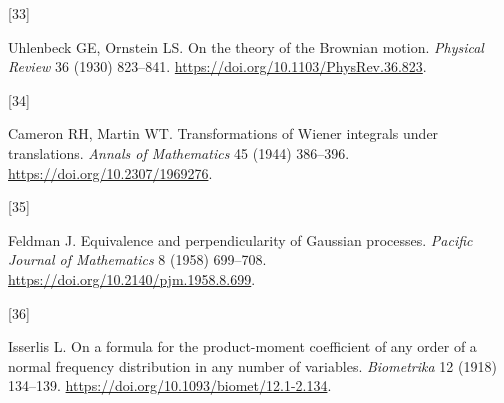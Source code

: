\documentclass[ejs]{imsart}
\newlength{\cslhangindent}\setlength{\cslhangindent}{1.5em}
\newlength{\csllabelwidth}\setlength{\csllabelwidth}{3em}
\newenvironment{CSLReferences}[2]
 {\begin{list}{}{\setlength{\itemindent}{0pt}\setlength{\leftmargin}{0pt}\setlength{\parsep}{0pt}
 \ifodd #1\setlength{\leftmargin}{\cslhangindent}\setlength{\itemindent}{-1\cslhangindent}\fi
 \setlength{\itemsep}{#2\baselineskip}}}{\end{list}}
\newcommand{\CSLLeftMargin}[1]{\parbox[t]{\csllabelwidth}{\strut#1\strut}}
\newcommand{\CSLRightInline}[1]{\parbox[t]{\linewidth-\csllabelwidth}{\strut#1\strut}}
\begin{document}
\begin{CSLReferences}{0}{0}
\CSLLeftMargin{{[}33{]} }%
\CSLRightInline{Uhlenbeck GE, Ornstein LS. On the theory of the
{B}rownian motion. \emph{Physical Review} 36 (1930) 823--841.
\url{https://doi.org/10.1103/PhysRev.36.823}.}

\CSLLeftMargin{{[}34{]} }%
\CSLRightInline{Cameron RH, Martin WT. Transformations of {W}iener
integrals under translations. \emph{Annals of Mathematics} 45 (1944)
386--396. \url{https://doi.org/10.2307/1969276}.}

\CSLLeftMargin{{[}35{]} }%
\CSLRightInline{Feldman J. Equivalence and perpendicularity of
{G}aussian processes. \emph{Pacific Journal of Mathematics} 8 (1958)
699--708. \url{https://doi.org/10.2140/pjm.1958.8.699}.}

\CSLLeftMargin{{[}36{]} }%
\CSLRightInline{Isserlis L. On a formula for the product-moment
coefficient of any order of a normal frequency distribution in any
number of variables. \emph{Biometrika} 12 (1918) 134--139.
\url{https://doi.org/10.1093/biomet/12.1-2.134}.}

\end{CSLReferences}
\end{document}
